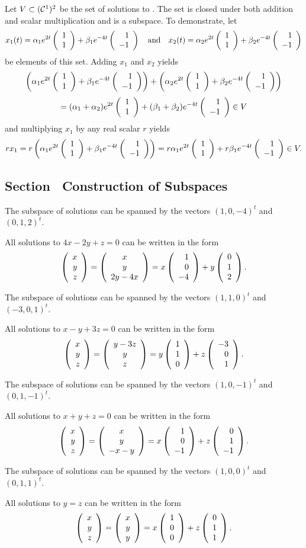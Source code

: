 \documentclass{ximera}
\begin{document}
Let $V \subset (\CCone)^2$ be the set of solutions to .
The set is closed under both addition and scalar multiplication and
is a subspace.
To demonstrate, let
\[
x_1(t) = \alpha_1 e^{2t}\vectwo{1}{1} +
\beta_1 e^{-4t}\vectwo{1}{-1} \AND x_2(t) =
\alpha_2 e^{2t}\vectwo{1}{1} + \beta_2 e^{-4t}\vectwo{1}{-1}
\]
be elements of this set.  Adding $x_1$ and $x_2$ yields
\[
\left(\alpha_1 e^{2t}\vectwo{1}{1} +
\beta_1 e^{-4t}\vectwo{1}{-1}\right) +
\left(\alpha_2 e^{2t}\vectwo{1}{1}
+ \beta_2 e^{-4t}\vectwo{1}{-1}\right)
\]
\[
= (\alpha_1 + \alpha_2)e^{2t}\vectwo{1}{1} +
(\beta_1 + \beta_2) e^{-4t}\vectwo{1}{-1} \in V
\]
and multiplying $x_1$ by any real scalar $r$ yields
\[
rx_1 = r\left(\alpha_1 e^{2t}\vectwo{1}{1} +
\beta_1 e^{-4t}\vectwo{1}{-1}\right) = r\alpha_1 e^{2t}\vectwo{1}{1} +
r\beta_1 e^{-4t}\vectwo{1}{-1} \in V.
\]


\subsection*{Section~\protect{\ref{S:5.2}} Construction of Subspaces}

 \ans The subspace of solutions can be spanned by the vectors 
$(1,0,-4)^t$ and $(0,1,2)^t$.

\soln All solutions to $4x - 2y + z = 0$ can be written in the form
\[
\vecthree{x}{y}{z} = \cvecthree{x}{y}{2y - 4x}
= x\vecthree{1}{0}{-4} + y\vecthree{0}{1}{2}.
\]

  \ans The subspace of solutions can be spanned by the vectors 
$(1,1,0)^t$ and $(-3,0,1)^t$.

\soln All solutions to $x - y + 3z = 0$ can be written in the form
\[
\vecthree{x}{y}{z} = \cvecthree{y-3z}{y}{z}
= y\vecthree{1}{1}{0} + z\vecthree{-3}{0}{1}.
\]

  \ans The subspace of solutions can be spanned by the vectors 
$(1,0,-1)^t$ and $(0,1,-1)^t$.

\soln All solutions to $x + y + z = 0$ can be written in the form
\[
\vecthree{x}{y}{z} = \cvecthree{x}{y}{-x-y}
= x\vecthree{1}{0}{-1} + z\vecthree{0}{1}{-1}.
\]



 \ans The subspace of solutions can be spanned by the vectors 
$(1,0,0)^t$ and $(0,1,1)^t$.

\soln All solutions to $y = z$ can be written in the form
\[
\vecthree{x}{y}{z} = \cvecthree{x}{y}{y}
= x\vecthree{1}{0}{0} + z\vecthree{0}{1}{1}.
\]
\end{document}
